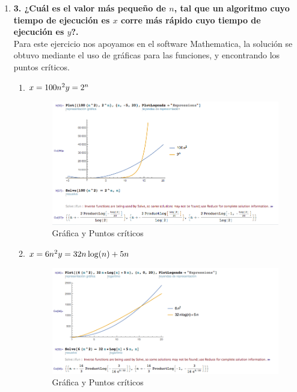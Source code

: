 \documentclass[11 pt, a4paper]{article}
\theoremstyle{definition}
\begin{document}
\begin{enumerate}
\begin{itemize}
    \end{itemize}
\item \textbf{3. ¿Cuál es el valor más pequeño de $n$, tal que un algoritmo cuyo tiempo de ejecución es $x$ corre más rápido cuyo tiempo de ejecución es $y$?.}\\
Para este ejercicio nos apoyamos en el software Mathematica, la solución se obtuvo mediante el uso de gráficas para las funciones, y encontrando los puntos críticos.\\
    \begin{enumerate}
        \item $x = 100n^2 \\ y = 2^n$ \\
        \begin{figure}[H]
         \centering
          \includegraphics[trim=0cm 0cm 0cm 0cm, width=10cm]{3a.png} 
          \caption{Gráfica y Puntos críticos}
        \end{figure}
        \item $x = 6n^2 \\ y = 32n\log(n)+5n$
        \begin{figure}[H]
         \centering
          \includegraphics[trim=0cm 0cm 0cm 0cm, width=10cm]{3b.png} 
          \caption{Gráfica y Puntos críticos}
        \end{figure} 
    \end{enumerate}


\end{enumerate}
\end{document}

